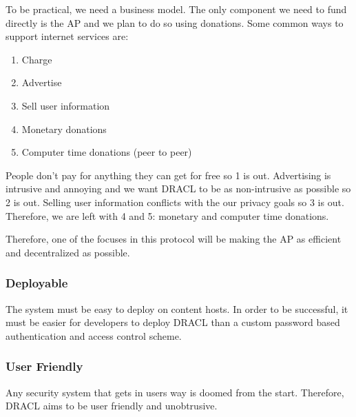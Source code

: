 \documentclass[pdftex,12pt,a4papaer]{article}
\begin{document}
To be practical, we need a business model. The only component we need to fund
directly is the AP and we plan to do so using donations. Some common ways to
support internet services are:

\begin{enumerate}
    \item Charge
    \item Advertise
    \item Sell user information
    \item Monetary donations
    \item Computer time donations (peer to peer)
\end{enumerate}

People don't pay for anything they can get for free so 1 is out. Advertising is
intrusive and annoying and we want DRACL to be as non-intrusive as possible so 2
is out. Selling user information conflicts with the our privacy goals so 3 is
out. Therefore, we are left with 4 and 5: monetary and computer time donations.

Therefore, one of the focuses in this protocol will be making the AP as
efficient and decentralized as possible.

\subsubsection{Deployable}

The system must be easy to deploy on content hosts. In order to be successful,
it must be easier for developers to deploy DRACL than a custom password based
authentication and access control scheme.

\subsubsection{User Friendly}

Any security system that gets in users way is doomed from the start. Therefore,
DRACL aims to be user friendly and unobtrusive.
\end{document}
